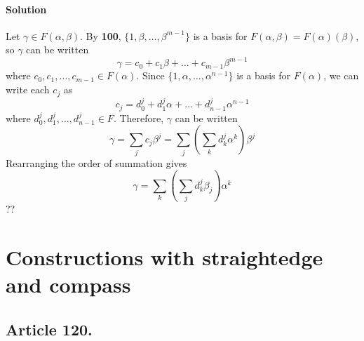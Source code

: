 \paragraph*{Solution}
Let $\gamma \in F(\alpha, \beta)$. By \textbf{100},
$\{ 1, \beta, \dots, \beta^{m-1} \}$ is a basis for
$F(\alpha, \beta) = F(\alpha)(\beta)$, so $\gamma$ can be written
$$\gamma = c_0 + c_1 \beta + \dots + c_{m-1} \beta^{m-1}$$
where $c_0, c_1, \dots, c_{m-1} \in F(\alpha)$. Since
$\{ 1, \alpha, \dots, \alpha^{n-1} \}$ is a basis for $F(\alpha)$, we
can write each $c_j$ as
$$ c_j = d_0^j + d_1^j \alpha + \dots + d_{n-1}^j \alpha^{n-1} $$
where $d_0^j, d_1^j, \dots, d_{n-1}^j \in F$. Therefore, $\gamma$ can be written
$$\gamma = \sum_j c_j \beta^j = \sum_j \left( \sum_k d_k^j \alpha^k \right) \beta^j $$
Rearranging the order of summation gives
$$\gamma = \sum_k \left( \sum_j d_k^j \beta_j \right) \alpha^k$$
??


\section{Constructions with straightedge and compass}

\subsection{Article 120.}

